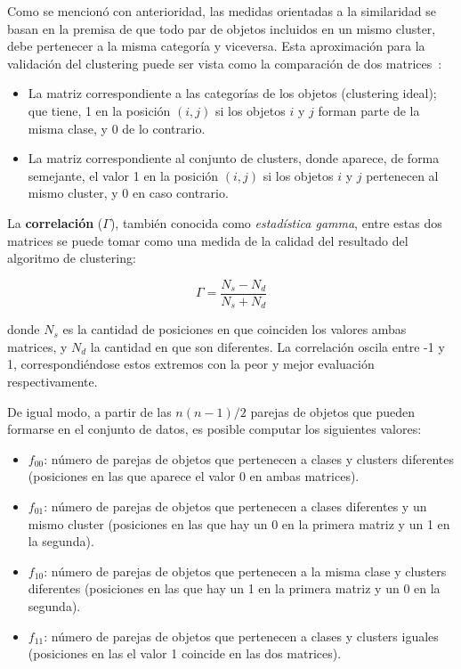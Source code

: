 Como se mencionó con anterioridad, las medidas orientadas a la similaridad se basan en la premisa de que todo par de objetos incluidos en un mismo cluster, debe pertenecer a la misma categoría y viceversa.
Esta aproximación para la validación del clustering puede ser vista como la comparación de dos matrices~\cite{Tan05}:

\begin{itemize}
    \item La matriz correspondiente a las categorías de los objetos (clustering ideal);
    que tiene, 1 en la posición $(i, j)$ si los objetos $i$ y $j$ forman parte de la misma clase, y 0 de lo contrario.
    \item La matriz correspondiente al conjunto de clusters, donde aparece, de forma semejante, el valor 1 en la posición $(i,j)$ si los objetos $i$ y $j$ pertenecen al mismo cluster, y 0 en caso contrario.
\end{itemize}

La \textbf{correlación} ($\Gamma$), también conocida como \textit{estadística gamma}, entre estas dos matrices se puede tomar como una medida de la calidad del resultado del algoritmo de clustering:

\begin{equation}
    \label{eq:gamma-statistic}
    \Gamma = \frac{N_s - N_d}{N_s + N_d}
\end{equation}

\noindent
donde $N_s$ es la cantidad de posiciones en que coinciden los valores ambas matrices, y $N_d$ la cantidad en que son diferentes.
La correlación oscila entre -1 y 1, correspondiéndose estos extremos con la peor y mejor evaluación respectivamente.

De igual modo, a partir de las $n(n-1)/2$ parejas de objetos que pueden formarse en el conjunto de datos, es posible computar los siguientes valores:

\begin{itemize}
    \item $f_{00}$: número de parejas de objetos que pertenecen a clases y clusters diferentes (posiciones en las que aparece el valor 0 en ambas matrices).
    \item $f_{01}$: número de parejas de objetos que pertenecen a clases diferentes y un mismo cluster (posiciones en las que hay un 0 en la primera matriz y un 1 en la segunda).
    \item $f_{10}$: número de parejas de objetos que pertenecen a la misma clase y clusters diferentes (posiciones en las que hay un 1 en la primera matriz y un 0 en la segunda).
    \item $f_{11}$: número de parejas de objetos que pertenecen a clases y clusters iguales (posiciones en las el valor 1 coincide en las dos matrices).
\end{itemize}

